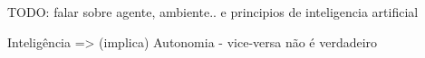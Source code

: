 TODO: falar sobre agente, ambiente.. e principios de inteligencia artificial

Inteligência => (implica) Autonomia
- vice-versa não é verdadeiro
